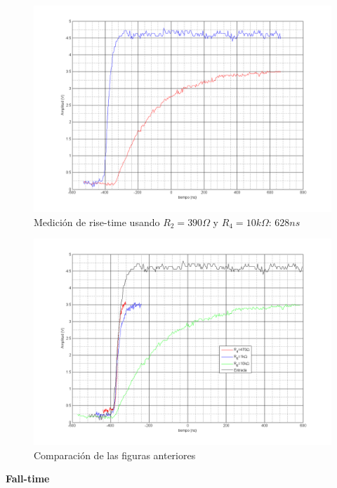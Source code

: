 \documentclass[12pt,a4paper]{article}
\begin{document}
\begin{figure}[H]
\centering
\includegraphics[width=\textwidth]{img/RT3.png}
\caption{Medición de rise-time usando $R_2=390\Omega$ y $R_4=10k\Omega$:
$628ns$}
\end{figure}

\begin{figure}[H]
\centering
\includegraphics[width=\textwidth]{img/compRT.png}
\caption{Comparación de las figuras anteriores}
\end{figure}

\textbf{Fall-time}
\end{document}

